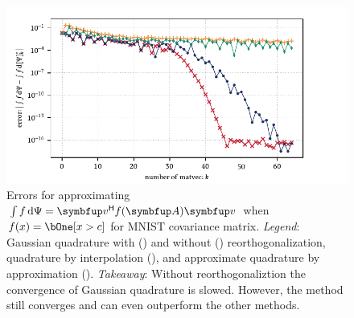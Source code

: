 \begin{figure}[htb]
    \begin{center}
        \includegraphics{imgs/ch3_MNIST.pdf} 
    \end{center}
    \caption[{Errors for approximating \( \int f \,\d\Psi =  \vec{v}^\cT f(\vec{A}) \vec{v} \) when \( f(x) = \bOne[x > c] \) for MNIST covariance matrix.}]{%
    Errors for approximating \( \int f \,\d\Psi =  \vec{v}^\cT f(\vec{A}) \vec{v} \) when \( f(x) = \bOne[x > c] \) for MNIST covariance matrix.
    \hspace{.25em}\emph{Legend}:
    Gaussian quadrature with 
    ({\protect{}})
    and without 
    ({\protect{}})
    reorthogonalization,
    quadrature by interpolation
    ({\protect{}}),
    and approximate quadrature by approximation
    ({\protect{}}).
    \hspace{.25em}\emph{Takeaway}: Without reorthogonaliztion the convergence of Gaussian quadrature is slowed. 
    However, the method still converges and can even outperform the other methods.
    }
    \label{fig:ch3_California}
\end{figure}



